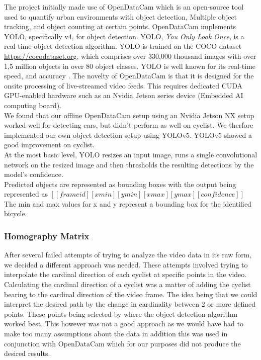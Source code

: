 The project initially made use of OpenDataCam which is an open-source tool used to quantify urban environments with object detection, Multiple object tracking, and object counting at certain points.
OpenDataCam implements YOLO, specifically v4, for object detection.
YOLO, \textit{You Only Look Once}, is a real-time object detection algorithm. YOLO is trained on the COCO dataset \url{https://cocodataset.org}, which comprises over 330,000 thousand images
with over 1,5 million objects in over 80 object classes.
YOLO is well known for its real-time speed, and accuracy \cite{redmon2016look}.
The novelty of OpenDataCam is that it is designed for the onsite processing of live-streamed video feeds. This requires dedicated CUDA GPU-enabled hardware such as an Nvidia Jetson series device (Embedded AI computing board).
\ \\
We found that our offline OpenDataCam setup using an Nvidia Jetson NX setup worked well for detecting cars, but didn't perform as well on cyclist. We therfore implemented our own object detection setup using
YOLOv5. YOLOv5 showed a good improvement on cyclist.
\ \\ 
At the most basic level, YOLO resizes an input image, runs a single convolutional network on the resized image
and then thresholds the resulting detections by the model’s confidence.
\ \\ 
Predicted objects are represented as bounding boxes with the output being represented as $[[frame id][xmin][ymin][xmax][ymax][confidence]]$
\ \\
The min and max values for x and y represent a bounding box for the identified bicycle.

\subsubsection{Homography Matrix}

After several failed attempts of trying to analyze the video data in its raw form, we decided a different approach was needed.
These attempts involved trying to interpolate the cardinal direction of each cyclist at specific points in the video. Calculating the cardinal direction
of a cyclist was a matter of adding the cyclist bearing to the cardinal direction of the video frame. The idea being that we could interpret
the desired path by the change in cardinality between 2 or more defined points. These points being selected by where the object detection algorithm worked best.
This however was not a good approach as we would have had to make too many assumptions about the data in addition this was used in conjunction
with OpenDataCam which for our purposes did not produce the desired results.

